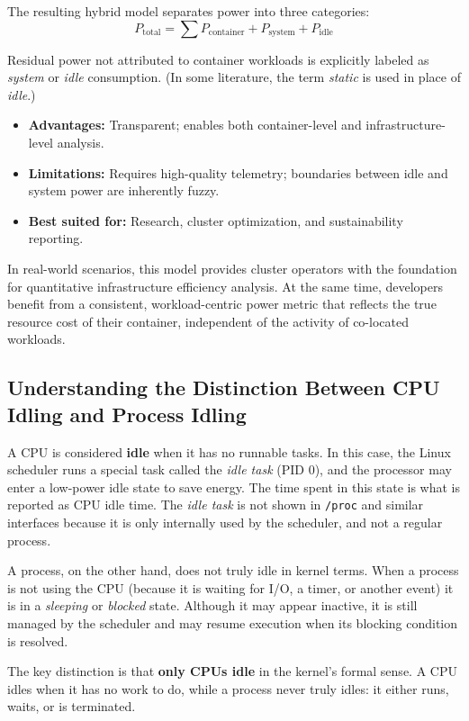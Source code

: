 The resulting hybrid model separates power into three categories:
\begin{equation}
    P_\text{total} = \sum P_\text{container} + P_\text{system} + P_\text{idle}
\end{equation}

Residual power not attributed to container workloads is explicitly labeled as \textit{system} or \textit{idle} consumption. (In some literature, the term \textit{static} is used in place of \textit{idle}.)

\begin{itemize}
    \item \textbf{Advantages:} Transparent; enables both container-level and infrastructure-level analysis.
    \item \textbf{Limitations:} Requires high-quality telemetry; boundaries between idle and system power are inherently fuzzy.
    \item \textbf{Best suited for:} Research, cluster optimization, and sustainability reporting.
\end{itemize}

In real-world scenarios, this model provides cluster operators with the foundation for quantitative infrastructure efficiency analysis. At the same time, developers benefit from a consistent, workload-centric power metric that reflects the true resource cost of their container, independent of the activity of co-located workloads.

\subsection{Understanding the Distinction Between CPU Idling and Process Idling}
A CPU is considered \textbf{idle} when it has no runnable tasks. In this case, the Linux scheduler runs a special task called the \textit{idle task} (PID 0), and the processor may enter a low-power idle state to save energy. The time spent in this state is what is reported as CPU idle time. The \textit{idle task} is not shown in \texttt{/proc} and similar interfaces because it is only internally used by the scheduler, and not a regular process.

A process, on the other hand, does not truly idle in kernel terms. When a process is not using the CPU (because it is waiting for I/O, a timer, or another event) it is in a \textit{sleeping} or \textit{blocked} state. Although it may appear inactive, it is still managed by the scheduler and may resume execution when its blocking condition is resolved.

The key distinction is that \textbf{only CPUs idle} in the kernel’s formal sense. A CPU idles when it has no work to do, while a process never truly idles: it either runs, waits, or is terminated.